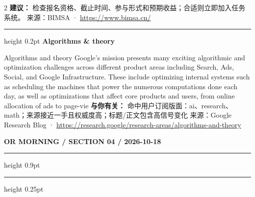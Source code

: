 \documentclass[10.5pt]{ctexart}
\begin{document}
\begin{multicols}{2}
\textbf{建议：} 检查报名资格、截止时间、参与形式和预期收益；合适则立即加入任务系统。
{\footnotesize\color{ormuted} 来源：BIMSA · \url{https://www.bimsa.cn/}}
\vspace{2mm}
\hrule height 0.2pt
\vspace{2mm}
{\large\bfseries Algorithms \& theory}\par
Algorithms and theory Google’s mission presents many exciting algorithmic and optimization challenges across different product areas including Search, Ads, Social, and Google Infrastructure. These include optimizing internal systems such as scheduling the machines that power the numerous computations done each day, as well as optimizations that affect core products and users, from online allocation of ads to page-vie
\textbf{与你有关：} 命中用户订阅版面：ai、research、math；来源接近一手且权威度高；标题/正文包含高信号变化
{\footnotesize\color{ormuted} 来源：Google Research Blog · \url{https://research.google/research-areas/algorithms-and-theory}}
\end{multicols}
\newpage
{\small\bfseries OR MORNING / SECTION 04 / 2026-10-18}
\vspace{2mm}
\hrule height 0.9pt
\vspace{1.5mm}
\hrule height 0.25pt
\vspace{4mm}
\end{document}

